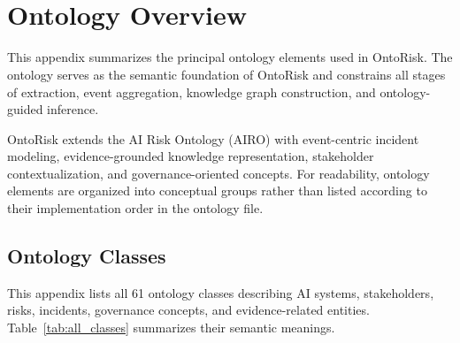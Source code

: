 \documentclass[a4paper,fleqn]{cas-dc}
\begin{document}


\onecolumn
\appendix
\renewcommand{\thesection}{Appendix \Alph{section}}
\renewcommand{\thesubsection}{\Alph{section}.\arabic{subsection}}
\renewcommand{\thetable}{\Alph{section}.\arabic{table}}
\renewcommand{\thefigure}{\Alph{section}.\arabic{figure}}
\setcounter{table}{0}
\setcounter{figure}{0}

\section[Appendix A. Ontology Overview]{\mbox{}\\[2pt]Ontology Overview}
\label{app:ontology}

This appendix summarizes the principal ontology elements used in OntoRisk.
The ontology serves as the semantic foundation of OntoRisk and
constrains all stages of extraction, event aggregation, knowledge graph
construction, and ontology-guided inference.

OntoRisk extends the AI Risk Ontology (AIRO) with event-centric incident
modeling, evidence-grounded knowledge representation, stakeholder
contextualization, and governance-oriented concepts.
For readability, ontology elements are organized into conceptual groups rather
than listed according to their implementation order in the ontology file.

\subsection{Ontology Classes}

This appendix lists all 61 ontology classes describing AI systems, stakeholders,
risks, incidents, governance concepts, and evidence-related entities.
Table~\ref{tab:all_classes} summarizes their semantic meanings.

\small
\end{document}
